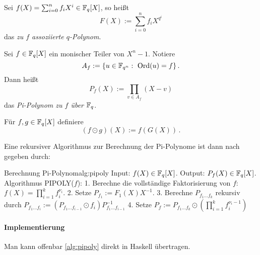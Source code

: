 \begin{definition}
  Sei $f(X) = \sum_{i=0}^n f_i X^i \in \mathbb{F}_q[X]$, so heißt 
  \[ F(X) := \sum_{i=0}^n f_i X^{q^i}\]
  das \emph{zu $f$ assoziierte $q$-Polynom}.
\end{definition}

\begin{definition}
  Sei $f \in \mathbb{F}_q[X]$ ein monischer Teiler von $X^n-1$. Notiere
  \[ A_f := \{ u \in \mathbb{F}_{q^n}:\ \operatorname{Ord}(u) = f\}\,.\]
  Dann heißt 
  \[ P_f(X) := \prod_{v\in A_f} (X-v)\]
  das \emph{Pi-Polynom zu $f$ über $\mathbb{F}_q$}.
\end{definition}

\begin{definition}
  Für $f,g\in \mathbb{F}_q[X]$ definiere
  \[ (f\odot g)(X) := f(G(X))\,.\]
\end{definition}

Eine rekursiver Algorithmus zur Berechnung der Pi-Polynome ist dann nach
\autocite[Abschnitt 4]{hach92} gegeben durch:
\begin{pseudocode}{Berechnung Pi-Polynom}{alg:pipoly}
Input: $f(X) \in \mathbb{F}_q[X]$.
Output: $P_f(X) \in \mathbb{F}_q[X]$.
Algorithmus PIPOLY($f$):
  1. Berechne die vollständige Faktorisierung von $f$:
     $f(X) = \prod_{i=1}^k f_i^{\nu_i}$.
  2. Setze $P_{f_1} := F_1(X) X^{-1}$.
  3. Berechne $P_{f_1\ldots f_k}$ rekursiv durch
     $P_{f_1\ldots f_i} := (P_{f_1\ldots f_{i-1}} \odot f_i) P_{f_1\ldots f_{i-1}}^{-1}$
  4. Setze $P_f := P_{f_1\ldots f_k} \odot ( \prod_{i=1}^k f_i^{\nu_i-1})$
\end{pseudocode}

\paragraph{Implementierung} Man kann offenbar \autoref{alg:pipoly} direkt
in Haskell übertragen.


